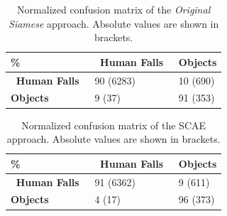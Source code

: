 \begin{table}[t]
	\caption{Normalized confusion matrix of the \textit{Original Siamese} approach. Absolute values are shown in brackets.}
	\label{tab:cm_prai}
	\begin{center}
		\begin{tabular}[t]{C{3cm}|C{3cm}|C{3cm}}	
			
			\hline
			\textbf{\%} & \textbf{$\,$ Human Falls $\,$ } & \textbf{Objects} \\ %
			\hline
			\textbf{$\,$ Human Falls $\,$ }     			& 90 (6283)    &  10 (690)     \\
			\textbf{Objects} 								& 9 (37)   &   91 (353)     	\\
			\hline
		\end{tabular}
	\end{center}
\end{table}
\begin{table}[t]
	\caption{Normalized confusion matrix of the SCAE approach. Absolute values are shown in brackets.}
	\label{tab:cm_scae}
	\begin{center}
		
		\begin{tabular}[t]{C{3cm}|C{3cm}|C{3cm}}
			\hline
			\textbf{\%}                                                    & \textbf{$\,$ Human Falls $\,$ } & \textbf{Objects} \\
			
			\hline
			\textbf{$\,$ Human Falls $\,$ } & 91 (6362)                       & 9 (611)          \\
			\textbf{Objects}                                               & 4 (17)                          & 96 (373)         \\ \hline
		\end{tabular}
	\end{center}
\end{table}


